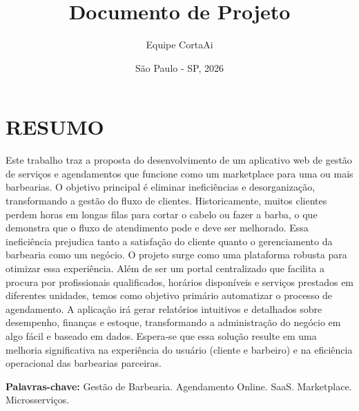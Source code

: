 \documentclass[12pt, a4paper]{report}
\begin{document}
\title{\textbf{Documento de Projeto}}
\author{Equipe CortaAi}
\date{São Paulo - SP, 2026}

\maketitle
\clearpage
\tableofcontents
\clearpage

\chapter{RESUMO}
\label{ch:resumo}

Este trabalho traz a proposta do desenvolvimento de um aplicativo web de gestão de serviços e agendamentos que funcione como um marketplace para uma ou mais barbearias. O objetivo principal é eliminar ineficiências e desorganização, transformando a gestão do fluxo de clientes.
Historicamente, muitos clientes perdem horas em longas filas para cortar o cabelo ou fazer a barba, o que demonstra que o fluxo de atendimento pode e deve ser melhorado. Essa ineficiência prejudica tanto a satisfação do cliente quanto o gerenciamento da barbearia como um negócio.
O projeto surge como uma plataforma robusta para otimizar essa experiência. Além de ser um portal centralizado que facilita a procura por profissionais qualificados, horários disponíveis e serviços prestados em diferentes unidades, temos como objetivo primário automatizar o processo de agendamento.
A aplicação irá gerar relatórios intuitivos e detalhados sobre desempenho, finanças e estoque, transformando a administração do negócio em algo fácil e baseado em dados. Espera-se que essa solução resulte em uma melhoria significativa na experiência do usuário (cliente e barbeiro) e na eficiência operacional das barbearias parceiras.

\vspace{\baselineskip}
\noindent\textbf{Palavras-chave:} Gestão de Barbearia. Agendamento Online. SaaS. Marketplace. Microsserviços.
\end{document}
